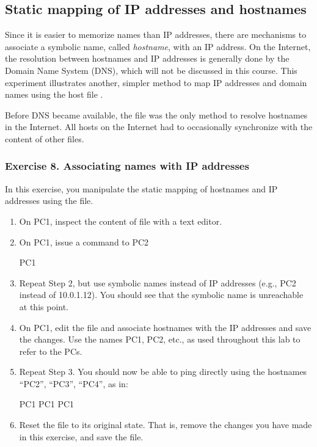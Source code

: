 \begin{questions}
\end{questions}

\newpage
\subsection{Static mapping of IP addresses and hostnames}

Since it is easier to memorize names than IP addresses, there are mechanisms to associate a symbolic name, called \emph{hostname}, with an IP address. On the Internet, the resolution between hostnames and IP addresses is generally done by the Domain Name System (DNS), which will not be discussed in this course. This experiment illustrates another, simpler method to map IP addresses and domain names using the host file .

Before DNS became available, the  file was the only method to resolve hostnames in the Internet. All hosts on the Internet had to occasionally synchronize with the content of other  files.

\subsubsection*{Exercise 8. Associating names with IP addresses}

In this exercise, you manipulate the static mapping of hostnames and IP addresses using the  file.
\begin{enumerate}
	\item On PC1, inspect the content of file  with a text editor.
	\item On PC1, issue a  command to PC2
		\begin{cmdblock}
	PC1%
		\end{cmdblock}
	\item Repeat Step 2, but use symbolic names instead of IP addresses (e.g., PC2 instead of 10.0.1.12). You should see that the symbolic name is unreachable at this point.
	\item On PC1, edit the file  and associate hostnames with the IP addresses and save the changes. Use the names PC1, PC2, etc., as used throughout this lab to refer to the PCs.
	\item Repeat Step 3. You should now be able to ping directly using the hostnames ``PC2'', ``PC3'', ``PC4'', as in:
		\begin{cmdblock}
	PC1%
	PC1%
	PC1%
		\end{cmdblock}
	\item Reset the  file to its original state. That is, remove the changes you have made in this exercise, and save the file.
\end{enumerate}

